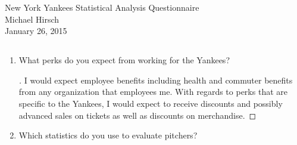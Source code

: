 \documentclass[]{article}
\theoremstyle{definition}
\begin{document}
\thispagestyle{empty}

\begin{center}
{\Large New York Yankees Statistical Analysis Questionnaire}\\
Michael Hirsch\\ %
January 26, 2015 %
\end{center}

\vspace{0.2 cm}


\subsection*{}


\begin{enumerate}
\item\label{norms}

What perks do you expect from working for the Yankees?

\begin{proof}[\unskip\nopunct]\renewcommand{\qedsymbol}{}
	I would expect employee benefits including health and commuter benefits from any organization that employees me. With regards to perks that are specific to the Yankees, I would expect to receive discounts and possibly advanced sales on tickets as well as discounts on merchandise. 
\end{proof}

\item

Which statistics do you use to evaluate pitchers?


\end{enumerate}
\end{document}
